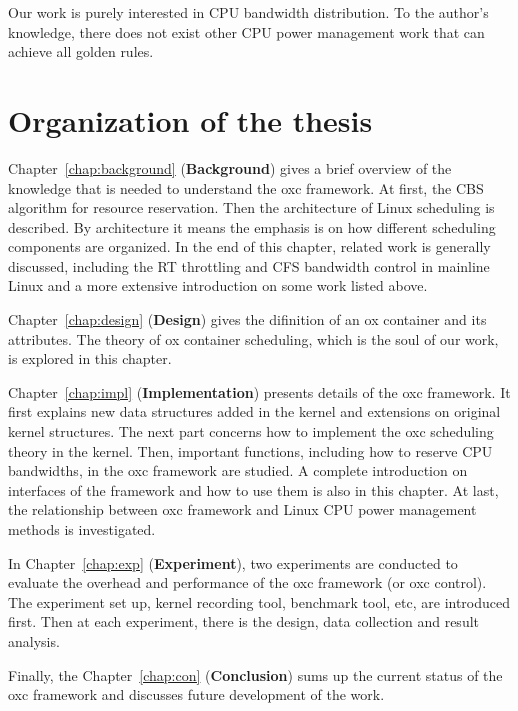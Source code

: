 Our work is purely interested in CPU bandwidth distribution.
To the author's knowledge, there does not exist other 
CPU power management work that can achieve all golden rules.

%
\section{Organization of the thesis}
Chapter~\ref{chap:background} ({\bf Background}) gives a brief overview
of the knowledge that is needed to understand the oxc framework. At first,
the CBS algorithm for resource reservation. Then the architecture of 
Linux scheduling is described. By architecture it means the emphasis is 
on how different scheduling components are organized. In the end of this
chapter, related work is generally discussed, including the RT throttling
and CFS bandwidth control in mainline Linux and a more extensive 
introduction on some work listed above.

Chapter~\ref{chap:design} ({\bf Design}) gives the difinition of an ox 
container and its attributes. The theory of ox container scheduling, which
is the soul of our work, is explored in this chapter. 

Chapter~\ref{chap:impl} ({\bf Implementation}) presents details of the oxc
framework. It first explains new data structures added in the kernel and 
extensions on original kernel structures. The next part concerns how to 
implement the oxc scheduling theory in the kernel. Then, important functions,
including how to reserve CPU bandwidths, in the oxc framework are studied.
A complete introduction on interfaces of the framework and how to use them
is also in this chapter. At last, the relationship between oxc framework
and Linux CPU power management methods is investigated.

In Chapter~\ref{chap:exp} ({\bf Experiment}), two experiments are conducted
to evaluate the overhead and performance of the oxc framework (or oxc control).
The experiment set up, kernel recording tool, benchmark tool,
etc, are introduced first. Then at each experiment, there is the design, 
data collection and result analysis.

Finally, the Chapter~\ref{chap:con} ({\bf Conclusion}) sums up the current
status of the oxc framework and discusses future development of the work. 
